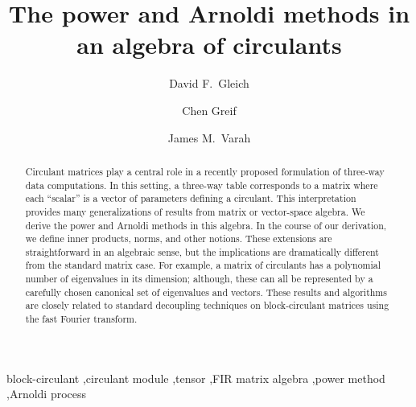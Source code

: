 \documentclass[1p,authoryear,letterpaper]{elsarticle}
\begin{document}
\begin{frontmatter}

\title{The power and Arnoldi methods in an algebra of circulants}
\author{David F.~Gleich\footnotemark[1]\footnotemark[2]}
\address{Sandia National Labs\footnotemark[3], Livermore, CA, United States}


\author{Chen Greif\footnotemark[2]}


\author{James M.~Varah\footnotemark[2]}
\address{The University of British Columbia, Vancouver, BC, Canada}


\begin{abstract}
Circulant matrices play a central role in a recently proposed
formulation of three-way data computations.
In this
setting, a three-way table corresponds to a matrix where each
``scalar'' is a vector of parameters defining a circulant.
This interpretation
provides many generalizations of results from matrix or
vector-space algebra. We derive the power and Arnoldi methods
in this algebra.
In the course of our derivation, we define inner products, norms, and other notions.
These extensions are straightforward in an
algebraic sense, but the implications are dramatically different
from the standard matrix case. For example, a matrix of
circulants has a polynomial number of eigenvalues in its
dimension; although, these can all be represented by a
carefully chosen canonical set of eigenvalues and vectors.
These results and algorithms are closely related to standard decoupling
techniques on block-circulant matrices using the fast Fourier transform.
\end{abstract}


\begin{keyword}
 block-circulant \sep circulant module \sep tensor
 \sep FIR matrix algebra \sep power method \sep Arnoldi process
\end{keyword}

\renewcommand{\thefootnote}{\fnsymbol{footnote}}


\end{frontmatter}
\end{document}
